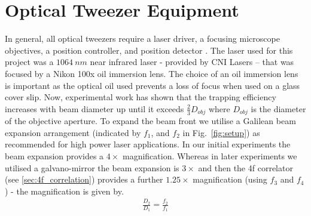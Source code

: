 \section{Optical Tweezer Equipment}
In general, all optical tweezers require a laser driver, a focusing 
microscope objectives, a position controller, and position detector 
\cite{Gieseler2020}. The laser used for this project was a $1064\ 
nm$ near infrared laser - provided by CNI Lasers – that was focused 
by a Nikon 100x oil immersion lens. The choice of an oil immersion 
lens is important as the optical oil used prevents a loss of focus 
when used on a glass cover slip. Now, experimental work has shown 
that the trapping efficiency increases with beam diameter up until 
it exceeds $\frac{2}{3}D_{obj}$ \cite{kim2003dependence} where 
$D_{obj}$ is the diameter of the objective aperture. To expand the 
beam front we utilise a Galilean beam expansion arrangement 
(indicated by $f_1$, and $f_2$ in Fig.~\ref{fig:setup}) as recommended 
for high power laser applications. In our initial experiments the 
beam expansion provides a $4\times$ magnification. Whereas in later 
experiments we utilised a galvano-mirror the beam expansion is 
$3\times$ and then the 4f correlator (see \ref{sec:4f_correlation})
provides a further $1.25\times$ magnification (using $f_3$ and $f_4$) 
- the magnification is given by.
\begin{align}
	\frac{D_2}{D_1} = \frac{f_2}{f_1}
\end{align}

